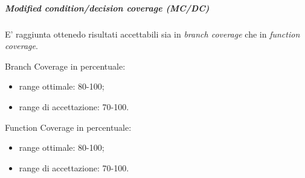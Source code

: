 \subparagraph{Modified condition/decision coverage (MC/DC)}
E' raggiunta ottenedo risultati accettabili sia in \textit{branch coverage} che in \textit{function coverage}.

Branch Coverage in percentuale:
\begin{itemize}
	\item range ottimale: 80-100;
	\item range di accettazione: 70-100.
\end{itemize}

Function Coverage in percentuale:
\begin{itemize}
	\item range ottimale: 80-100;
	\item range di accettazione: 70-100.
\end{itemize}

